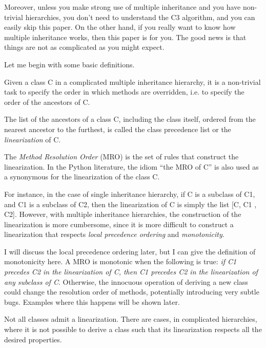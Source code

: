 \documentclass[10pt,a4paper,english]{article}
\begin{document}
Moreover, unless you make strong use of multiple inheritance and you
have non-trivial hierarchies, you don't need to understand the C3
algorithm, and you can easily skip this paper.  On the other hand, if
you really want to know how multiple inheritance works, then this paper
is for you.  The good news is that things are not as complicated as you
might expect.

Let me begin with some basic definitions.
\begin{list}{)}
{
\setlength{\rightmargin}{\leftmargin}
}
\item {} 
Given a class C in a complicated multiple inheritance hierarchy, it
is a non-trivial task to specify the order in which methods are
overridden, i.e. to specify the order of the ancestors of C.

\item {} 
The list of the ancestors of a class C, including the class itself,
ordered from the nearest ancestor to the furthest, is called the
class precedence list or the \emph{linearization} of C.

\item {} 
The \emph{Method Resolution Order} (MRO) is the set of rules that
construct the linearization.  In the Python literature, the idiom
``the MRO of C'' is also used as a synonymous for the linearization of
the class C.

\item {} 
For instance, in the case of single inheritance hierarchy, if C is a
subclass of C1, and C1 is a subclass of C2, then the linearization of
C is simply the list {[}C, C1 , C2].  However, with multiple
inheritance hierarchies, the construction of the linearization is 
more cumbersome, since it is more difficult to construct a
linearization that respects \emph{local precedence ordering} and
\emph{monotonicity}.

\item {} 
I will discuss the local precedence ordering later, but I can give
the definition of monotonicity here.  A MRO is monotonic when the
following is true:  \emph{if C1 precedes C2 in the linearization of C,
then C1 precedes C2 in the linearization of any subclass of C}.
Otherwise, the innocuous operation of deriving a new class could
change the resolution order of methods, potentially introducing very
subtle bugs.  Examples where this happens will be shown later.

\item {} 
Not all classes admit a linearization.  There are cases, in
complicated hierarchies, where it is not possible to derive a class
such that its linearization respects all the desired properties.

\end{list}
\end{document}
